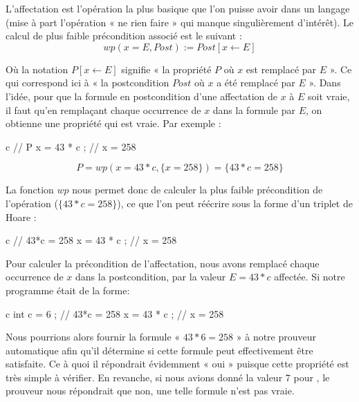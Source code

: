 

L'affectation est l'opération la plus basique que l'on puisse avoir dans un 
langage (mise à part l'opération « ne rien faire » qui manque singulièrement 
d'intérêt). Le calcul de plus faible précondition associé est le suivant :
$$wp(x = E , Post) := Post[x \leftarrow E]$$


Où la notation $P[x \leftarrow E]$ signifie « la propriété $P$ où $x$ est remplacé
par $E$ ». Ce qui correspond ici à « la postcondition $Post$ où $x$ a été
remplacé par $E$ ». Dans l'idée, pour que la formule en postcondition d'une 
affectation de $x$ à $E$ soit vraie, il faut qu'en remplaçant chaque occurrence de
$x$ dans la formule par $E$, on obtienne une propriété qui est vraie. Par exemple :



\begin{CodeBlock}{c}
// { P }
x = 43 * c ;
// { x = 258 }
\end{CodeBlock}

$$P = wp(x = 43*c , \{x = 258\}) = \{43*c = 258\}$$


La fonction $wp$ nous permet donc de calculer la plus faible précondition de
l'opération ($\{43*c = 258\}$), ce que l'on peut réécrire sous la forme d'un
triplet de Hoare :



\begin{CodeBlock}{c}
// { 43*c = 258 }
x = 43 * c ;
// { x = 258 }
\end{CodeBlock}



Pour calculer la précondition de l'affectation, nous avons remplacé chaque 
occurrence de $x$ dans la postcondition, par la valeur $E = 43*c$ affectée.
Si notre programme était de la forme:



\begin{CodeBlock}{c}
int c = 6 ;
// { 43*c = 258 }
x = 43 * c ;
// { x = 258 }
\end{CodeBlock}



Nous pourrions alors fournir la formule « $43*6 = 258$ » à notre prouveur automatique
afin qu'il détermine si cette formule peut effectivement être satisfaite. Ce à quoi
il répondrait évidemment « oui » puisque cette propriété est très simple à vérifier.
En revanche, si nous avions donné la valeur 7 pour , le prouveur nous répondrait
que non, une telle formule n'est pas vraie.



